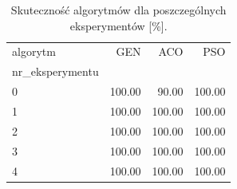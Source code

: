 \begin{table}
\caption{Skuteczność algorytmów dla poszczególnych eksperymentów [\%].}
\label{tab:success_rate}
\begin{tabular}{lrrr}
\toprule
algorytm & GEN & ACO & PSO \\
nr_eksperymentu &  &  &  \\
\midrule
0 & 100.00 & 90.00 & 100.00 \\
1 & 100.00 & 100.00 & 100.00 \\
2 & 100.00 & 100.00 & 100.00 \\
3 & 100.00 & 100.00 & 100.00 \\
4 & 100.00 & 100.00 & 100.00 \\
\bottomrule
\end{tabular}
\end{table}
